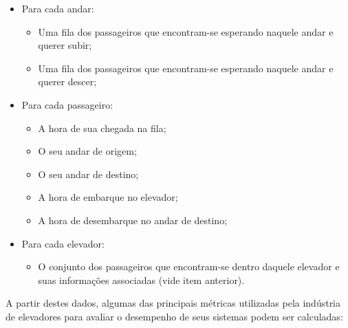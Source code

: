 \begin{itemize}
  \item Para cada andar:
  \begin{itemize}
    \item Uma fila dos passageiros que encontram-se esperando naquele andar e querer subir;
    \item Uma fila dos passageiros que encontram-se esperando naquele andar e querer descer;
  \end{itemize}
  \item Para cada passageiro:
  \begin{itemize}
    \item A hora de sua chegada na fila;
    \item O seu andar de origem;
    \item O seu andar de destino;
    \item A hora de embarque no elevador;
    \item A hora de desembarque no andar de destino;
  \end{itemize}
  \item Para cada elevador:
  \begin{itemize}
    \item O conjunto dos passageiros que encontram-se dentro daquele elevador e suas informações associadas (vide item anterior).
  \end{itemize}
\end{itemize}

A partir destes dados, algumas das principais métricas utilizadas pela indústria
de elevadores para avaliar o desempenho de seus sistemas podem ser calculadas:

